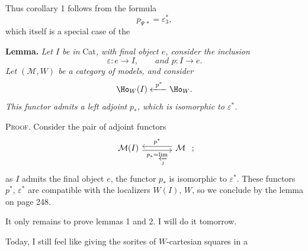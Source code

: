 Thus corollary 1 follows from the formula
\[
p_{\tilde{\Psi}\,*}=\varepsilon_3^*,
\]
which itself is a special case of the


\textbf{Lemma.} \textit{Let $I$ be in} Cat\textit{, with final object $e$, consider the inclusion}
\[
\varepsilon : e\longrightarrow I,\qquad \textit{and } p : I\longrightarrow e.
\]
\textit{Let $(\mathcal{M},W)$ be a category of models, and consider}
\[
\Ho_W(I)\xleftarrow{\ p^*\ }\Ho_W.
\]
\textit{This functor admits a left adjoint} \textit{$p_*$, which is isomorphic to $\varepsilon^*$.}

\textsc{Proof}. Consider the pair of adjoint functors
\[
\begin{tikzcd}[ampersand replacement=\&, column sep=large]
\mathcal{M}(I) \arrow[r, shift right, "p_*=\varprojlim\limits_I"'] \& \mathcal{M} \arrow[l, shift right, "p^*"']
\end{tikzcd}\ ;
\]
as $I$ admits the final object $e$, the functor $p_*$ is isomorphic to $\varepsilon^*$. These functors $p^*$, $\varepsilon^*$ are compatible with the localizers $W(I)$, $W$, so we conclude by the lemma on page 248.

It only remains to prove lemmas 1 and 2. I will do it tomorrow.

Today, I still feel like giving the sorites of $W$-cartesian squares in a

